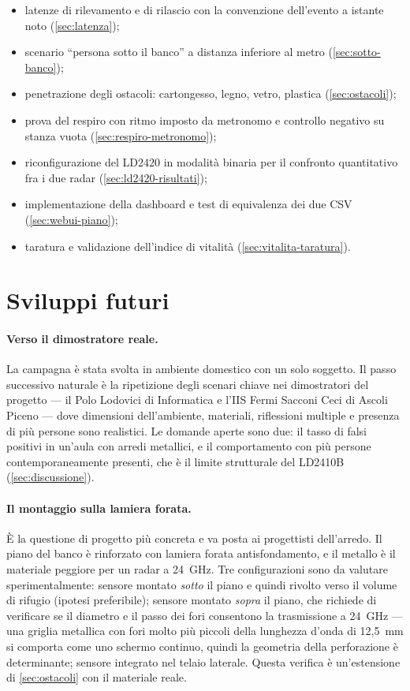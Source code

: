 \begin{itemize}[leftmargin=1.4em,itemsep=2pt]
  \item latenze di rilevamento e di rilascio con la convenzione dell'evento a
        istante noto (\cref{sec:latenza});
  \item scenario ``persona sotto il banco'' a distanza inferiore al metro
        (\cref{sec:sotto-banco});
  \item penetrazione degli ostacoli: cartongesso, legno, vetro, plastica
        (\cref{sec:ostacoli});
  \item prova del respiro con ritmo imposto da metronomo e controllo negativo su
        stanza vuota (\cref{sec:respiro-metronomo});
  \item riconfigurazione del LD2420 in modalità binaria per il confronto quantitativo
        fra i due radar (\cref{sec:ld2420-risultati});
  \item implementazione della dashboard e test di equivalenza dei due CSV
        (\cref{sec:webui-piano});
  \item taratura e validazione dell'indice di vitalità
        (\cref{sec:vitalita-taratura}).
\end{itemize}

\section{Sviluppi futuri}

\paragraph{Verso il dimostratore reale.} La campagna è stata svolta in ambiente
domestico con un solo soggetto. Il passo successivo naturale è la ripetizione degli
scenari chiave nei dimostratori del progetto --- il Polo Lodovici di Informatica e
l'IIS Fermi Sacconi Ceci di Ascoli Piceno --- dove dimensioni dell'ambiente,
materiali, riflessioni multiple e presenza di più persone sono realistici. Le
domande aperte sono due: il tasso di falsi positivi in un'aula con arredi metallici,
e il comportamento con più persone contemporaneamente presenti, che è il limite
strutturale del LD2410B (\cref{sec:discussione}).

\paragraph{Il montaggio sulla lamiera forata.} È la questione di progetto più
concreta e va posta ai progettisti dell'arredo. Il piano del banco è rinforzato con
lamiera forata antisfondamento, e il metallo è il materiale peggiore per un radar a
24~GHz. Tre configurazioni sono da valutare sperimentalmente: sensore montato
\emph{sotto} il piano e quindi rivolto verso il volume di rifugio (ipotesi
preferibile); sensore montato \emph{sopra} il piano, che richiede di verificare se il
diametro e il passo dei fori consentono la trasmissione a 24~GHz --- una griglia
metallica con fori molto più piccoli della lunghezza d'onda di 12,5~mm si comporta
come uno schermo continuo, quindi la geometria della perforazione è determinante;
sensore integrato nel telaio laterale. Questa verifica è un'estensione di
\cref{sec:ostacoli} con il materiale reale.

